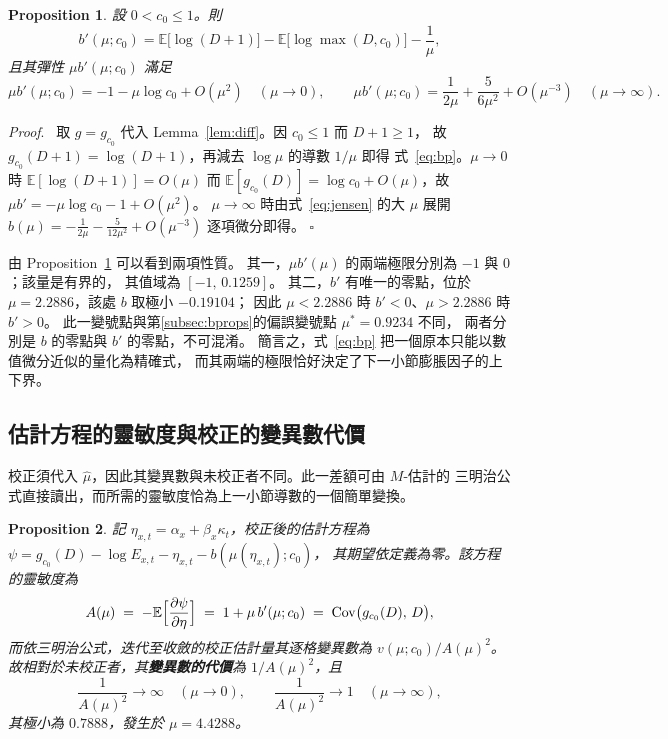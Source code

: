 \documentclass[UTF8, fontset=macnew, a4paper, 12pt]{ctexart}
\newtheorem{prop}{Proposition}
\newenvironment{proof}{\par\noindent\textit{Proof}.\ }{\hfill$\square$\par\vspace{4pt}}
\newcommand{\Ex}{\mathbb{E}}
\begin{document}
\begin{prop}\label{prop:bp}
設 $0<c_0\le1$。則
\begin{equation}\label{eq:bp}
b'(\mu;c_0)=\Ex\bigl[\log(D{+}1)\bigr]-\Ex\bigl[\log\max(D,c_0)\bigr]-\frac{1}{\mu},
\end{equation}
且其彈性 $\mu b'(\mu;c_0)$ 滿足
\[
\mu b'(\mu;c_0)=-1-\mu\log c_0+O(\mu^2)\quad(\mu\to0),\qquad
\mu b'(\mu;c_0)=\frac{1}{2\mu}+\frac{5}{6\mu^{2}}+O(\mu^{-3})\quad(\mu\to\infty).
\]
\end{prop}

\begin{proof}
取 $g=g_{c_0}$ 代入 Lemma~\ref{lem:diff}。因 $c_0\le1$ 而 $D+1\ge1$，
故 $g_{c_0}(D{+}1)=\log(D{+}1)$，再減去 $\log\mu$ 的導數 $1/\mu$ 即得
式~\eqref{eq:bp}。$\mu\to0$ 時 $\Ex[\log(D{+}1)]=O(\mu)$ 而
$\Ex[g_{c_0}(D)]=\log c_0+O(\mu)$，故 $\mu b'=-\mu\log c_0-1+O(\mu^2)$。
$\mu\to\infty$ 時由式~\eqref{eq:jensen} 的大 $\mu$ 展開
$b(\mu)=-\frac{1}{2\mu}-\frac{5}{12\mu^{2}}+O(\mu^{-3})$ 逐項微分即得。
\end{proof}

由 Proposition~\ref{prop:bp} 可以看到兩項性質。
其一，$\mu b'(\mu)$ 的兩端極限分別為 $-1$ 與 $0$；該量是有界的，
其值域為 $[-1,\,0.1259]$。
其二，$b'$ 有唯一的零點，位於 $\mu=2.2886$，該處 $b$ 取極小 $-0.19104$；
因此 $\mu<2.2886$ 時 $b'<0$、$\mu>2.2886$ 時 $b'>0$。
此一變號點與第\ref{subsec:bprops}的偏誤變號點 $\mu^{\ast}=0.9234$ 不同，
兩者分別是 $b$ 的零點與 $b'$ 的零點，不可混淆。
簡言之，式~\eqref{eq:bp} 把一個原本只能以數值微分近似的量化為精確式，
而其兩端的極限恰好決定了下一小節膨脹因子的上下界。

\subsection{估計方程的靈敏度與校正的變異數代價}\label{subsec:inflate}

校正須代入 $\hat\mu$，因此其變異數與未校正者不同。此一差額可由 $M$-估計的
三明治公式直接讀出，而所需的靈敏度恰為上一小節導數的一個簡單變換。

\begin{prop}\label{prop:infl}
記 $\eta_{x,t}=\alpha_x+\beta_x\kappa_t$，校正後的估計方程為
$\psi=g_{c_0}(D)-\log E_{x,t}-\eta_{x,t}-b(\mu(\eta_{x,t});c_0)$，
其期望依定義為零。該方程的靈敏度為
\begin{equation}\label{eq:sensA}
A(\mu)\;=\;-\Ex\Bigl[\frac{\partial\psi}{\partial\eta}\Bigr]
\;=\;1+\mu\,b'(\mu;c_0)\;=\;\mathrm{Cov}\bigl(g_{c_0}(D),\,D\bigr),
\end{equation}
而依三明治公式，迭代至收斂的校正估計量其逐格變異數為 $v(\mu;c_0)/A(\mu)^2$。
故相對於未校正者，其\textbf{變異數的代價}為 $1/A(\mu)^2$，且
\[
\frac{1}{A(\mu)^2}\to\infty\quad(\mu\to0),\qquad
\frac{1}{A(\mu)^2}\to1\quad(\mu\to\infty),
\]
其極小為 $0.7888$，發生於 $\mu=4.4288$。
\end{prop}
\end{document}
